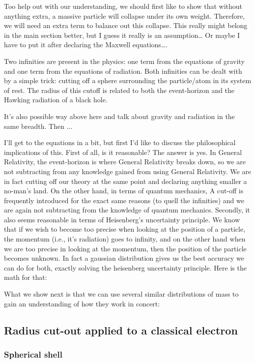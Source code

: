 \documentclass {article}
\begin{document}
Too help out with our understanding, we should first like to show that without anything extra, a massive particle will collapse under its own weight. Therefore, we will need an extra term to balance out this collapse. This really might belong in the main section better, but I guess it really is an assumption… Or maybe I have to put it after declaring the Maxwell equations…. 

Two infinities are present in the physics: one term from the equations of gravity and one term from the equations of radiation. Both infinities can be dealt with by a simple trick: cutting off a sphere surrounding the particle/atom in its system of rest. The radius of this cutoff is related to both the event-horizon and the Hawking radiation of a black hole.

It’s also possible way above here and talk about gravity and radiation in the same breadth. Then ...

I’ll get to the equations in a bit, but first I’d like to discuss the philosophical implications of this. First of all, is it reasonable? The answer is yes. In General Relativity, the event-horizon is where General Relativity breaks down, so we are not subtracting from any knowledge gained from using General Relativity. We are in fact cutting off our theory at the same point and declaring anything smaller a no-man’s land. On the other hand, in terms of quantum mechanics, A cut-off is frequently introduced for the exact same reasons (to quell the infinities) and we are again not subtracting from the knowledge of quantum mechanics. Secondly, it also seems reasonable in terms of Heisenberg’s uncertainty principle. We know that if we wish to become too precise when looking at the position of a particle, the momentum (i.e., it’s radiation) goes to infinity, and on the other hand when we are too precise in looking at the momentum, then the position of the particle becomes unknown. In fact a gaussian distribution gives us the best accuracy we can do for both, exactly solving the heisenberg uncertainty principle. Here is the math for that:

What we show next is that we can use several similar distributions of mass to gain an understanding of how they work in concert:

\subsection{Radius cut-out applied to a classical electron}

\subsubsection{Spherical shell}
\end{document}
